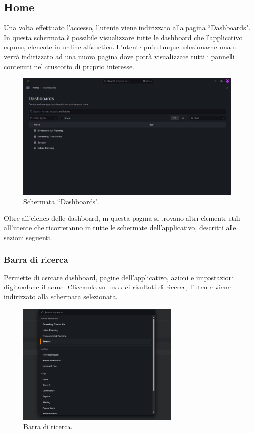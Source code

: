 \documentclass[8pt]{article}
\begin{document}
\subsection{Home}
Una volta effettuato l'accesso, l'utente viene indirizzato alla pagina ``Dashboards". 
In questa schermata è possibile visualizzare tutte le dashboard che l'applicativo espone, elencate in ordine alfabetico. L'utente può dunque selezionarne una e verrà indirizzato ad una nuova pagina dove potrà visualizzare tutti i pannelli contenuti nel cruscotto di proprio interesse.
\begin{figure}[H]
    \centering
    \includegraphics[width=15cm]{./images_mu/dashboards.png}
    \caption{Schermata ``Dashboards".}
    \label{figure:Schermata Dashboards.}
\end{figure}
Oltre all'elenco delle dashboard, in questa pagina si trovano altri elementi utili all'utente che ricorreranno in tutte le schermate dell'applicativo, descritti alle sezioni seguenti.

\subsubsection{Barra di ricerca} 
Permette di cercare dashboard, pagine dell'applicativo, azioni e impostazioni digitandone il nome. Cliccando su uno dei risultati di ricerca, l'utente viene indirizzato alla schermata selezionata.
\begin{figure}[H]
    \centering
    \includegraphics[width=8cm]{./images_mu/search.png}
    \caption{Barra di ricerca.}
    \label{figure:Barra di ricerca.}
\end{figure}
\end{document}
